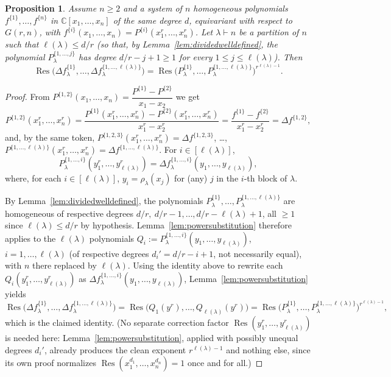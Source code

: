 \documentclass[12pt]{amsart}
\newtheorem{proposition}[theorem]{Proposition}
\theoremstyle{definition}
\newcommand{\Res}{\operatorname{Res}}
\DeclareMathOperator{\len}{\ell}
\begin{document}
\begin{proposition}
\label{prop:deltaP}
Assume $n \geqslant 2$ and a system of $n$ homogeneous polynomials $f^{\{1\}},\dots,f^{\{n\}}$ in $\mathbb{C}[x_1,\dots,x_n]$ of the same degree $d$, equivariant with respect to $G(r,n)$, with $f^{\{i\}}(x_1,\dots,x_n) = P^{\{i\}}(x_1^r,\dots,x_n^r)$. Let $\lambda \vdash n$ be a partition of $n$ such that $\len(\lambda) \leqslant d/r$ (so that, by Lemma~\ref{lem:dividedwelldefined}, the polynomial $P^{\{1,\dots,j\}}_\lambda$ has degree $d/r-j+1 \geqslant 1$ for every $1 \leqslant j \leqslant \len(\lambda)$). Then
\begin{equation}
\label{eq:propdeltaP}
\Res\Big(\Delta f^{\{1\}}_\lambda,\dots,\Delta f^{\{1,\dots,\len(\lambda)\}}_\lambda\Big) = \Res\Big(P^{\{1\}}_\lambda,\dots,P^{\{1,\dots,\len(\lambda)\}}_\lambda\Big)^{r^{\len(\lambda)-1}}.
\end{equation}
\end{proposition}

\begin{proof}
From $P^{\{1,2\}}(x_1,\dots,x_n) = \dfrac{P^{\{1\}}-P^{\{2\}}}{x_1-x_2}$ we get
\[
P^{\{1,2\}}(x_1^r,\dots,x_n^r) = \frac{P^{\{1\}}(x_1^r,\dots,x_n^r) - P^{\{2\}}(x_1^r,\dots,x_n^r)}{x_1^r-x_2^r} = \frac{f^{\{1\}}-f^{\{2\}}}{x_1^r-x_2^r} = \Delta f^{\{1,2\}},
\]
and, by the same token, $P^{\{1,2,3\}}(x_1^r,\dots,x_n^r) = \Delta f^{\{1,2,3\}}$, \dots, $P^{\{1,\dots,\len(\lambda)\}}(x_1^r,\dots,x_n^r) = \Delta f^{\{1,\dots,\len(\lambda)\}}$. For $i \in [\len(\lambda)]$,
\[
P^{\{1,\dots,i\}}_\lambda(y_1^r,\dots,y_{\len(\lambda)}^r) = \Delta f^{\{1,\dots,i\}}_\lambda(y_1,\dots,y_{\len(\lambda)}),
\]
where, for each $i \in [\len(\lambda)]$, $y_i = \rho_\lambda(x_j)$ for (any) $j$ in the $i$-th block of $\lambda$.

By Lemma~\ref{lem:dividedwelldefined}, the polynomials $P^{\{1\}}_\lambda,\dots,P^{\{1,\dots,\len(\lambda)\}}_\lambda$ are homogeneous of respective degrees $d/r,\ d/r-1,\dots,d/r-\len(\lambda)+1$, all $\geqslant 1$ since $\len(\lambda)\leqslant d/r$ by hypothesis. Lemma~\ref{lem:powersubstitution} therefore applies to the $\len(\lambda)$ polynomials $Q_i := P^{\{1,\dots,i\}}_\lambda(y_1,\dots,y_{\len(\lambda)})$, $i=1,\dots,\len(\lambda)$ (of respective degrees $d_i' = d/r-i+1$, not necessarily equal), with $n$ there replaced by $\len(\lambda)$. Using the identity above to rewrite each $Q_i(y_1^r,\dots,y_{\len(\lambda)}^r)$ as $\Delta f^{\{1,\dots,i\}}_\lambda(y_1,\dots,y_{\len(\lambda)})$, Lemma~\ref{lem:powersubstitution} yields
\[
\Res\Big(\Delta f^{\{1\}}_\lambda,\dots,\Delta f^{\{1,\dots,\len(\lambda)\}}_\lambda\Big) = \Res\big(Q_1(y^r),\dots,Q_{\len(\lambda)}(y^r)\big) = \Res\Big(P^{\{1\}}_\lambda,\dots,P^{\{1,\dots,\len(\lambda)\}}_\lambda\Big)^{r^{\len(\lambda)-1}},
\]
which is the claimed identity. (No separate correction factor $\Res(y_1^r,\dots,y_{\len(\lambda)}^r)$ is needed here: Lemma~\ref{lem:powersubstitution}, applied with possibly unequal degrees $d_i'$, already produces the clean exponent $r^{\len(\lambda)-1}$ and nothing else, since its own proof normalizes $\Res(x_1^{d_1},\dots,x_n^{d_n})=1$ once and for all.)
\end{proof}
\end{document}

